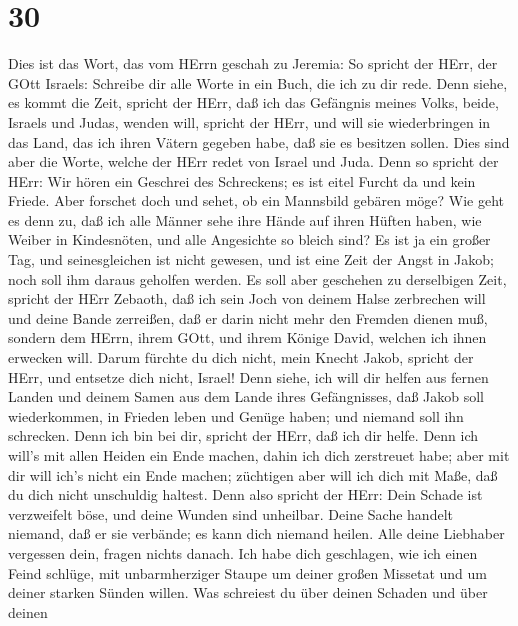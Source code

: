 \hypertarget{section-29}{%
\section{30}\label{section-29}}

 Dies ist das Wort, das vom HErrn geschah zu Jeremia:
 So spricht der HErr, der GOtt Israels: Schreibe dir alle
Worte in ein Buch, die ich zu dir rede.  Denn siehe, es
kommt die Zeit, spricht der HErr, daß ich das Gefängnis meines Volks,
beide, Israels und Judas, wenden will, spricht der HErr, und will sie
wiederbringen in das Land, das ich ihren Vätern gegeben habe, daß sie es
besitzen sollen.  Dies sind aber die Worte, welche der HErr
redet von Israel und Juda.  Denn so spricht der HErr: Wir
hören ein Geschrei des Schreckens; es ist eitel Furcht da und kein
Friede.  Aber forschet doch und sehet, ob ein Mannsbild
gebären möge? Wie geht es denn zu, daß ich alle Männer sehe ihre Hände
auf ihren Hüften haben, wie Weiber in Kindesnöten, und alle Angesichte
so bleich sind?  Es ist ja ein großer Tag, und
seinesgleichen ist nicht gewesen, und ist eine Zeit der Angst in Jakob;
noch soll ihm daraus geholfen werden.  Es soll aber
geschehen zu derselbigen Zeit, spricht der HErr Zebaoth, daß ich sein
Joch von deinem Halse zerbrechen will und deine Bande zerreißen, daß er
darin nicht mehr den Fremden dienen muß,  sondern dem HErrn,
ihrem GOtt, und ihrem Könige David, welchen ich ihnen erwecken will.
 Darum fürchte du dich nicht, mein Knecht Jakob, spricht
der HErr, und entsetze dich nicht, Israel! Denn siehe, ich will dir
helfen aus fernen Landen und deinem Samen aus dem Lande ihres
Gefängnisses, daß Jakob soll wiederkommen, in Frieden leben und Genüge
haben; und niemand soll ihn schrecken.  Denn ich bin bei
dir, spricht der HErr, daß ich dir helfe. Denn ich will's mit allen
Heiden ein Ende machen, dahin ich dich zerstreuet habe; aber mit dir
will ich's nicht ein Ende machen; züchtigen aber will ich dich mit Maße,
daß du dich nicht unschuldig haltest.  Denn also spricht
der HErr: Dein Schade ist verzweifelt böse, und deine Wunden sind
unheilbar.  Deine Sache handelt niemand, daß er sie
verbände; es kann dich niemand heilen.  Alle deine
Liebhaber vergessen dein, fragen nichts danach. Ich habe dich
geschlagen, wie ich einen Feind schlüge, mit unbarmherziger Staupe um
deiner großen Missetat und um deiner starken Sünden willen.
 Was schreiest du über deinen Schaden und über deinen
